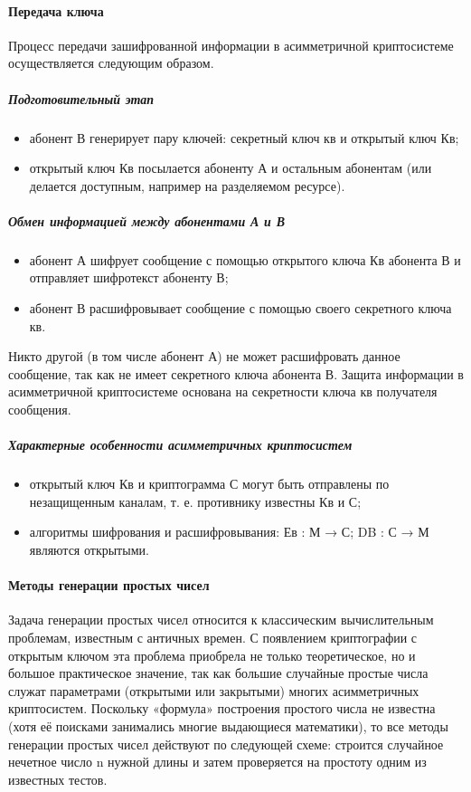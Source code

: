 \paragraph{Передача ключа}
Процесс передачи зашифрованной информации в асимметричной криптосистеме
осуществляется следующим образом.

\subparagraph{Подготовительный этап}
\begin{itemize}
  \item абонент В генерирует пару ключей: секретный ключ кв и открытый ключ
      Кв;
  \item открытый ключ Кв посылается абоненту А и остальным абонентам (или
      делается доступным, например на разделяемом ресурсе).
\end{itemize}

\subparagraph{Обмен информацией между абонентами А и В}
\begin{itemize}
  \item абонент А шифрует сообщение с помощью открытого ключа Кв абонента В
      и отправляет шифротекст абоненту В;
  \item абонент В расшифровывает сообщение с помощью своего секретного
      ключа кв.
\end{itemize}
Никто другой (в том числе абонент А) не может расшифровать данное сообщение,
так как не имеет секретного ключа абонента В. Защита информации в
асимметричной криптосистеме основана на секретности ключа кв получателя
сообщения.

\subparagraph{Характерные особенности асимметричных криптосистем}
\begin{itemize}
  \item открытый ключ Кв и криптограмма С могут быть отправлены по
      незащищенным каналам, т. е. противнику известны Кв и С;
  \item  алгоритмы шифрования и расшифровывания: Ев : М → С; DB : С → М
      являются открытыми.
\end{itemize}
%
\paragraph{Методы генерации простых чисел}
%
Задача генерации простых чисел относится к классическим вычислительным
проблемам, известным с античных времен. С появлением криптографии с открытым
ключом эта проблема приобрела не только теоретическое, но и большое
практическое значение, так как большие случайные простые числа служат
параметрами (открытыми или закрытыми) многих асимметричных криптосистем.
Поскольку «формула» построения простого числа не известна (хотя её поисками
занимались многие выдающиеся математики), то все методы генерации простых
чисел действуют по следующей схеме: строится случайное нечетное число n
нужной длины и затем проверяется на простоту одним из известных тестов.

